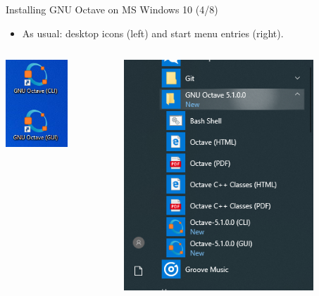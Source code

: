 \begin{frame}{Installing GNU Octave on MS Windows 10 (4/8)}
\begin{itemize}
\item
As usual: desktop icons (left) and start menu entries (right).
\end{itemize}
\begin{columns}
\begin{column}{0.4\textwidth}
\includegraphics[width=0.6\textwidth]{res/ms_windows/win_install_desktop_icons.png}
\end{column}
\begin{column}{0.4\textwidth}
\includegraphics[width=0.8\textwidth]{res/ms_windows/win_install_startmenu_icons.png}

\end{column}
\end{columns}
\end{frame}
